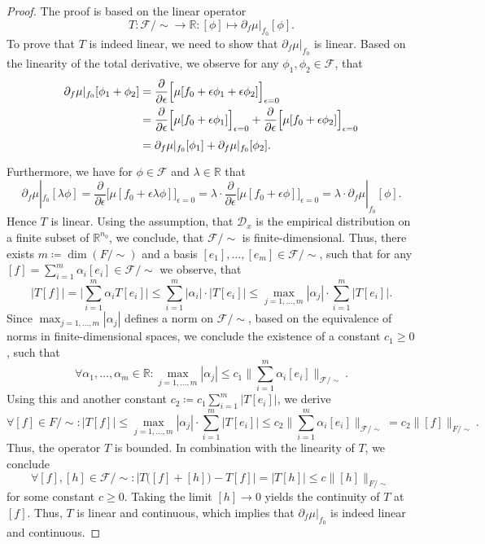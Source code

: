 \documentclass[11pt, a4paper]{article}
\newcommand{\R}{\mathbb{R}}
\newcommand{\D}{\mathcal{D}}
\newcommand{\F}{\mathcal{F}}
\begin{document}
\begin{proof}
The proof is based on the linear operator
\[ T : \F / {\sim} \to \R : [\phi] \mapsto \partial_f \mu |_{f_0} [\phi]. \]
To prove that $T$ is indeed linear, we need to show that $\partial_f \mu |_{f_0}$ is linear. Based on the linearity of the total derivative, we observe for any $\phi_1, \phi_2 \in \F$, that
\[ \begin{split}
\partial_f \mu |_{f_0} [\phi_1 + \phi_2] 
&= \frac{\partial}{\partial \epsilon} \Big [ \mu[f_0+\epsilon \phi_1 + \epsilon \phi_2 ] \Big ]_{\epsilon=0} \\\
&= \frac{\partial}{\partial \epsilon} \Big [ \mu[f_0+\epsilon \phi_1] \Big ]_{\epsilon=0} + \frac{\partial}{\partial \epsilon} \Big [ \mu[f_0+\epsilon \phi_2] \Big ]_{\epsilon=0} \\\
\textcolor{white}{\Big |} &= \partial_f \mu |_{f_0} [\phi_1] + \partial_f \mu |_{f_0} [\phi_2].
\end{split} \]
Furthermore, we have for $\phi \in \F$ and $\lambda \in \R$ that
\[ \partial_f \mu |_{f_0} [\lambda \phi] = \frac{\partial}{\partial \epsilon} \Big [ \mu[f_0+\epsilon \lambda \phi ] \Big ]_{\epsilon=0} = \lambda \cdot \frac{\partial}{\partial \epsilon} \Big [ \mu[f_0+\epsilon \phi ] \Big ]_{\epsilon=0} = \lambda \cdot \partial_f \mu |_{f_0} [\phi]. \]
Hence $T$ is linear. Using the assumption, that $\D_x$ is the empirical distribution on a finite subset of $\R^{n_0}$, we conclude, that $\F /{\sim}$ is finite-dimensional. Thus, there exists $m \coloneq \dim(F/{\sim})$ and a basis $[e_1], \dots, [e_m] \in \F / {\sim}$, such that for any $[f] = \sum_{i=1}^{m}\alpha_i[e_i] \in \F/{\sim}$ we observe, that
\[ \big | T[f] \big | = \Big | \sum_{i=1}^{m} \alpha_iT[e_i] \Big | \leq \sum_{i=1}^{m} \big | \alpha_i \big | \cdot \big | T[e_i] \big | \leq \max_{j=1,\dots,m} | \alpha_j | \cdot \sum_{i=1}^{m} \big | T[e_i] \big |. \]
Since $\max_{j=1,\dots,m} | \alpha_j |$ defines a norm on $\F/{\sim}$, based on the equivalence of norms in finite-dimensional spaces, we conclude the existence of a constant $c_1 \geq 0$, such that
\[ \forall \alpha_1, \dots, \alpha_m \in \R : \max_{j=1,\dots,m} | \alpha_j | \leq c_1 \Big \| \sum_{i=1}^{m} \alpha_i [e_i] \Big \|_{\F/{\sim}}. \]
Using this and another constant $c_2 \coloneq c_1 \sum_{i=1}^{m} \big | T [e_i] \big |$, we derive
\[ \forall [f] \in F/{\sim} : \big | T [f] \big | \leq \max_{j=1,\dots,m} | \alpha_j | \cdot \sum_{i=1}^{m} \big | T[e_i] \big | \leq c_2 \Big \| \sum_{i=1}^{m} \alpha_i [e_i] \Big \|_{\F/{\sim}} = c_2 \big \| [f] \big \|_{F/{\sim}}. \]
Thus, the operator $T$ is bounded. In combination with the linearity of $T$, we conclude
\[ \forall [f], [h] \in \F/{\sim} : \Big | T \big ( [f] + [h] \big ) - T [f] \Big | = \Big | T [h] \Big | \leq c \big \| [h] \big \|_{F/{\sim}} \]
for some constant $c \geq 0$. Taking the limit $[h] \to 0$ yields the continuity of $T$ at $[f]$. Thus, $T$ is linear and continuous, which implies that $\partial_f\mu |_{f_0}$ is indeed linear and continuous.
\end{proof}
\end{document}
